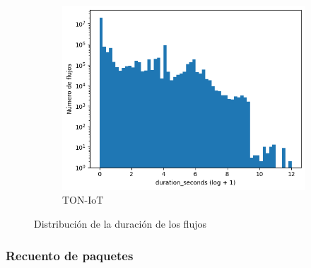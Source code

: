 \begin{figure}[H]
\begin{subfigure}[b]{0.32\textwidth}
        \centering
        \includegraphics[width=\linewidth]{media/packet_pincer_toniot/duration_seconds_log_x_log_y.png}
        \caption{TON-IoT}
    \end{subfigure}
       \caption{Distribución de la duración de los flujos}
       \label{fig:packet_pincer_duration}
\end{figure}

\subsubsection{Recuento de paquetes}

